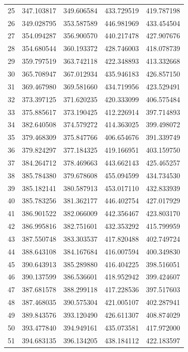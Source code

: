 \begin{table}
\begin{tabular}{rrrrr}
25 & 347.103817 & 349.606584 & 433.729519 & 419.787198 \\
26 & 349.028795 & 353.587589 & 446.981969 & 433.454504 \\
27 & 354.094287 & 356.900570 & 440.217478 & 427.907676 \\
28 & 354.680544 & 360.193372 & 428.746003 & 418.078739 \\
29 & 359.797519 & 363.742118 & 422.348893 & 413.332668 \\
30 & 365.708947 & 367.012934 & 435.946183 & 426.857150 \\
31 & 369.467980 & 369.581660 & 434.719956 & 423.529491 \\
32 & 373.397125 & 371.620235 & 420.333099 & 406.575484 \\
33 & 375.885617 & 373.190425 & 412.226914 & 397.714893 \\
34 & 382.640508 & 374.579272 & 414.363025 & 399.498072 \\
35 & 379.468309 & 375.847766 & 406.654676 & 391.339749 \\
36 & 379.824297 & 377.184325 & 419.166951 & 403.159750 \\
37 & 384.264712 & 378.469663 & 443.662143 & 425.465257 \\
38 & 385.784380 & 379.678608 & 455.094599 & 434.734530 \\
39 & 385.182141 & 380.587913 & 453.017110 & 432.833939 \\
40 & 385.783256 & 381.362177 & 446.402754 & 427.017929 \\
41 & 386.901522 & 382.066009 & 442.356467 & 423.803170 \\
42 & 386.995816 & 382.751601 & 432.353292 & 415.799959 \\
43 & 387.550748 & 383.303537 & 417.820488 & 402.749724 \\
44 & 388.643108 & 384.167684 & 416.007594 & 400.349830 \\
45 & 390.643913 & 385.289880 & 416.404225 & 398.516051 \\
46 & 390.137599 & 386.536601 & 418.952942 & 399.424607 \\
47 & 387.681578 & 388.299118 & 417.228536 & 397.517603 \\
48 & 387.468035 & 390.575304 & 421.005107 & 402.287941 \\
49 & 389.843576 & 393.120490 & 426.611307 & 408.874029 \\
50 & 393.477840 & 394.949161 & 435.073581 & 417.972000 \\
51 & 394.683135 & 396.134205 & 438.184112 & 422.183597 \\

\end{tabular}
\end{table}
